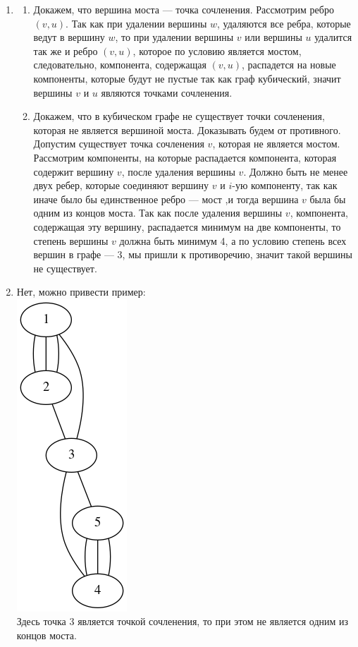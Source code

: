 \documentclass[a4paper,12pt]{article}
\begin{document}
\begin{enumerate}
\item \begin{enumerate}
\item Докажем, что вершина моста --- точка сочленения. Рассмотрим ребро $(v, u)$. Так как при удалении вершины $w$, удаляются все ребра, которые ведут в вершину $w$, то при удалении вершины $v$ или вершины $u$ удалится так же и ребро $(v,u)$, которое по условию является мостом, следовательно, компонента, содержащая $(v,u)$, распадется на новые компоненты, которые будут не пустые так как граф кубический, значит вершины $v$ и $u$ являются точками сочленения.
\item Докажем, что в кубическом графе не существует точки сочленения, которая не является вершиной моста. Доказывать будем от противного. Допустим существует точка сочленения $v$, которая не является мостом. Рассмотрим компоненты, на которые распадается компонента, которая содержит вершину $v$, после удаления вершины $v$. Должно быть не менее двух ребер, которые соединяют вершину $v$ и $i$-ую компоненту, так как иначе было бы единственное ребро --- мост ,и тогда вершина $v$ была бы одним из концов моста. Так как после удаления вершины $v$, компонента, содержащая эту вершину, распадается минимум на две компоненты, то степень вершины $v$ должна быть минимум 4, а по условию степень всех вершин в графе --- 3, мы пришли к противоречию, значит такой вершины не существует.
\end{enumerate}
\item Нет, можно привести пример:\\
\includegraphics[scale=0.4]{test.png}\\
Здесь точка 3 является точкой сочленения, то при этом не является одним из концов моста.
\end{enumerate}
\end{document}
